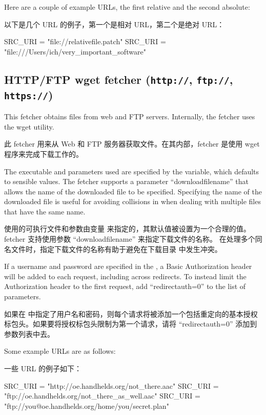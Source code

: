 Here are a couple of example URLs, the first relative and the second absolute:

以下是几个 URL 的例子，第一个是相对 URL，第二个是绝对 URL：

\begin{pyglist}
SRC_URI = "file://relativefile.patch"
SRC_URI = "file:///Users/ich/very_important_software"
\end{pyglist}

\subsection{HTTP/FTP wget fetcher (\texttt{http://}, \texttt{ftp://}, \texttt{https://})}

This fetcher obtains files from web and FTP servers. Internally, the fetcher uses the wget utility.

此 fetcher 用来从 Web 和 FTP 服务器获取文件。在其内部，fetcher 是使用 wget 程序来完成下载工作的。


The executable and parameters used are specified by the  variable, which defaults to sensible values. The fetcher supports a parameter ``downloadfilename'' that allows the name of the downloaded file to be specified. Specifying the name of the downloaded file is useful for avoiding collisions in  when dealing with multiple files that have the same name.

使用的可执行文件和参数由变量  来指定的，其默认值被设置为一个合理的值。fetcher 支持使用参数 ``downloadfilename'' 来指定下载文件的名称。 在处理多个同名文件时，指定下载文件的名称有助于避免在下载目录  中发生冲突。

If a username and password are specified in the , a Basic Authorization header will be added to each request, including across redirects. To instead limit the Authorization header to the first request, add ``redirectauth=0'' to the list of parameters.

如果在  中指定了用户名和密码，则每个请求将被添加一个包括重定向的基本授权标包头。如果要将授权标包头限制为第一个请求，请将 ``redirectauth=0'' 添加到参数列表中去。

Some example URLs are as follows:

一些 URL 的例子如下：

\begin{pyglist}
SRC_URI = "http://oe.handhelds.org/not_there.aac"
SRC_URI = "ftp://oe.handhelds.org/not_there_as_well.aac"
SRC_URI = "ftp://you@oe.handhelds.org/home/you/secret.plan"
\end{pyglist}

